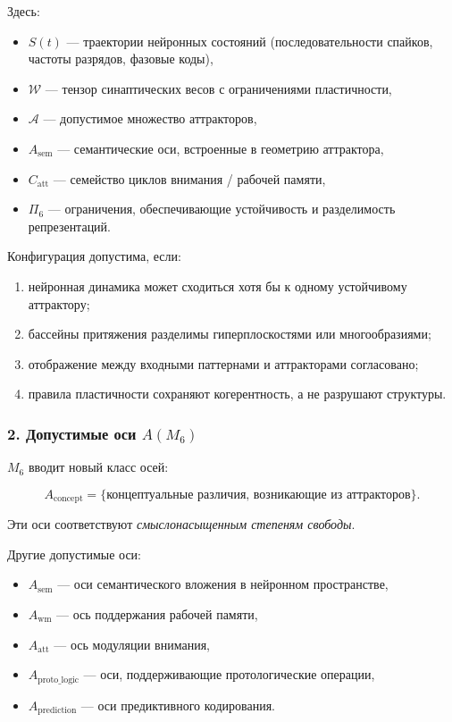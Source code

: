 Здесь:

\begin{itemize}
    \item $S(t)$ — траектории нейронных состояний (последовательности спайков, частоты разрядов, фазовые коды),
    \item $\mathcal{W}$ — тензор синаптических весов с ограничениями пластичности,
    \item $\mathcal{A}$ — допустимое множество аттракторов,
    \item $A_{\mathrm{sem}}$ — семантические оси, встроенные в геометрию аттрактора,
    \item $C_{\mathrm{att}}$ — семейство циклов внимания / рабочей памяти,
    \item $\Pi_6$ — ограничения, обеспечивающие устойчивость и разделимость репрезентаций.
\end{itemize}

Конфигурация допустима, если:

\begin{enumerate}
    \item нейронная динамика может сходиться хотя бы к одному устойчивому аттрактору;
    \item бассейны притяжения разделимы гиперплоскостями или многообразиями;
    \item отображение между входными паттернами и аттракторами согласовано;
    \item правила пластичности сохраняют когерентность, а не разрушают структуры.
\end{enumerate}

\subsubsection*{2. Допустимые оси \texorpdfstring{$A(M_6)$}{A(M_6)}}

$M_6$ вводит новый класс осей:

\[
A_{\mathrm{concept}} = \{ \text{концептуальные различия, возникающие из аттракторов} \}.
\]

Эти оси соответствуют \emph{смыслонасыщенным степеням свободы}.

Другие допустимые оси:

\begin{itemize}
    \item $A_{\mathrm{sem}}$ — оси семантического вложения в нейронном пространстве,
    \item $A_{\mathrm{wm}}$ — ось поддержания рабочей памяти,
    \item $A_{\mathrm{att}}$ — ось модуляции внимания,
    \item $A_{\mathrm{proto\_logic}}$ — оси, поддерживающие протологические операции,
    \item $A_{\mathrm{prediction}}$ — оси предиктивного кодирования.
\end{itemize}

